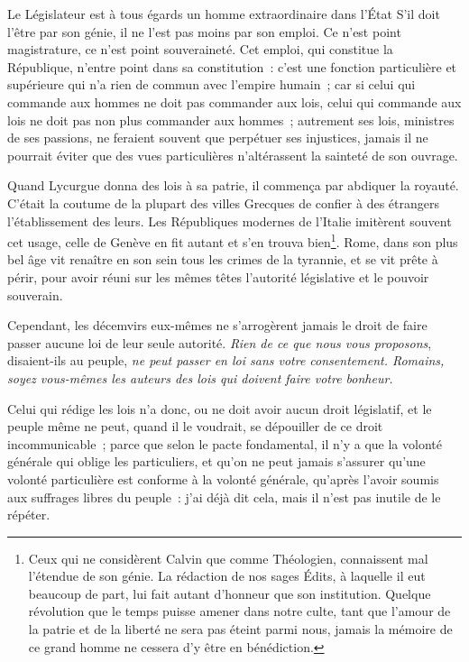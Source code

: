 \documentclass[french,twoside]{book} %
\begin{document}
Le Législateur est à tous égards un homme extraordinaire dans l’État S’il doit l’être par son génie, il ne l’est pas moins par son emploi. Ce n’est point magistrature, ce n’est point souveraineté. Cet emploi, qui constitue la République, n’entre point dans sa constitution : c’est une fonction particulière et supérieure qui n’a rien de commun avec l’empire humain ; car si celui qui commande aux hommes ne doit pas commander aux lois, celui qui commande aux lois ne doit pas non plus commander aux hommes ; autrement ses lois, ministres de ses passions, ne feraient souvent que perpétuer ses injustices, jamais il ne pourrait éviter que des vues particulières n’altérassent la sainteté de son ouvrage.\par
Quand Lycurgue donna des lois à sa patrie, il commença par abdiquer la royauté. C’était la coutume de la plupart des villes Grecques de confier à des étrangers l’établissement des leurs. Les Républiques modernes de l’Italie imitèrent souvent cet usage, celle de Genève en fit autant et s’en trouva bien\footnote{Ceux qui ne considèrent Calvin que comme Théologien, connaissent mal l’étendue de son génie. La rédaction de nos sages Édits, à laquelle il eut beaucoup de part, lui fait autant d’honneur que son institution. Quelque révolution que le temps puisse amener dans notre culte, tant que l’amour de la patrie et de la liberté ne sera pas éteint parmi nous, jamais la mémoire de ce grand homme ne cessera d’y être en bénédiction.}. Rome, dans son plus bel âge vit renaître en son sein tous les crimes de la tyrannie, et se vit prête à périr, pour avoir réuni sur les mêmes têtes l’autorité législative et le pouvoir souverain.\par
Cependant, les décemvirs eux-mêmes ne s’arrogèrent jamais le droit de faire passer aucune loi de leur seule autorité. {\itshape Rien de ce que nous vous proposons}, disaient-ils au peuple, {\itshape ne peut passer en loi sans votre consentement. Romains, soyez vous-mêmes les auteurs des lois qui doivent faire votre bonheur.}\par
Celui qui rédige les lois n’a donc, ou ne doit avoir aucun droit législatif, et le peuple même ne peut, quand il le voudrait, se dépouiller de ce droit incommunicable ; parce que selon le pacte fondamental, il n’y a que la volonté générale qui oblige les particuliers, et qu’on ne peut jamais s’assurer qu’une volonté particulière est conforme à la volonté générale, qu’après l’avoir soumis aux suffrages libres du peuple : j’ai déjà dit cela, mais il n’est pas inutile de le répéter.\par
\end{document}
